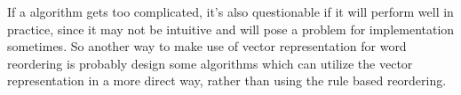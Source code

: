 If a algorithm gets too complicated, it's also questionable if it will perform well in practice, since it may not be intuitive and will pose a problem for implementation sometimes. So another way to make use of vector representation for word reordering is probably design some algorithms which can utilize the vector representation in a more direct way, rather than using the rule based reordering.